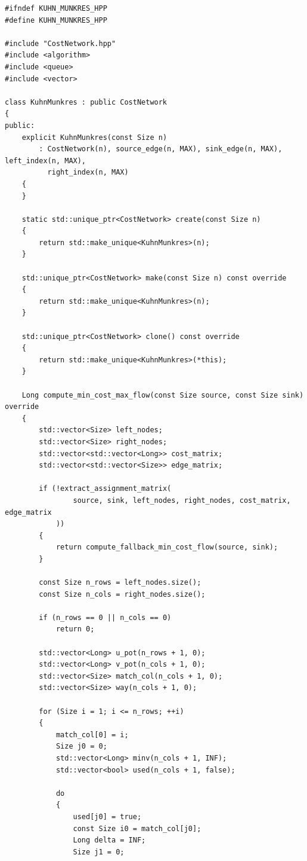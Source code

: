 \newpage

\label{ap:kuhn_munkres}

\begin{lstlisting}[caption={Implementação em C++ do algoritmo Húngaro (Kuhn-Munkres) para atribuição bipartida de custo mínimo.}, label={lst:kuhn_munkres}]
#ifndef KUHN_MUNKRES_HPP
#define KUHN_MUNKRES_HPP

#include "CostNetwork.hpp"
#include <algorithm>
#include <queue>
#include <vector>

class KuhnMunkres : public CostNetwork
{
public:
	explicit KuhnMunkres(const Size n)
	    : CostNetwork(n), source_edge(n, MAX), sink_edge(n, MAX), left_index(n, MAX),
	      right_index(n, MAX)
	{
	}

	static std::unique_ptr<CostNetwork> create(const Size n)
	{
		return std::make_unique<KuhnMunkres>(n);
	}

	std::unique_ptr<CostNetwork> make(const Size n) const override
	{
		return std::make_unique<KuhnMunkres>(n);
	}

	std::unique_ptr<CostNetwork> clone() const override
	{
		return std::make_unique<KuhnMunkres>(*this);
	}

	Long compute_min_cost_max_flow(const Size source, const Size sink) override
	{
		std::vector<Size> left_nodes;
		std::vector<Size> right_nodes;
		std::vector<std::vector<Long>> cost_matrix;
		std::vector<std::vector<Size>> edge_matrix;

		if (!extract_assignment_matrix(
		        source, sink, left_nodes, right_nodes, cost_matrix, edge_matrix
		    ))
		{
			return compute_fallback_min_cost_flow(source, sink);
		}

		const Size n_rows = left_nodes.size();
		const Size n_cols = right_nodes.size();

		if (n_rows == 0 || n_cols == 0)
			return 0;

		std::vector<Long> u_pot(n_rows + 1, 0);
		std::vector<Long> v_pot(n_cols + 1, 0);
		std::vector<Size> match_col(n_cols + 1, 0);
		std::vector<Size> way(n_cols + 1, 0);

		for (Size i = 1; i <= n_rows; ++i)
		{
			match_col[0] = i;
			Size j0 = 0;
			std::vector<Long> minv(n_cols + 1, INF);
			std::vector<bool> used(n_cols + 1, false);

			do
			{
				used[j0] = true;
				const Size i0 = match_col[j0];
				Long delta = INF;
				Size j1 = 0;


\end{lstlisting}
